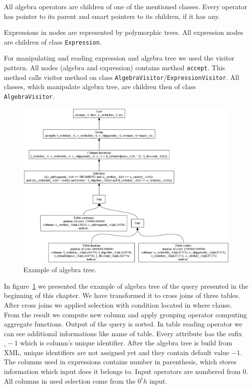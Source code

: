 All algebra operators are children of one of the mentioned classes. Every operator has pointer to its parent and smart pointers to its children, if it has any. 

Expressions in nodes are represented by polymorphic trees. All expression nodes are children of class \texttt{Expression}.

For manipulating and reading expression and algebra tree we used the visitor pattern. All nodes (algebra and expression) contains method \texttt{accept}. This method calls visitor method on class \texttt{AlgebraVisitor}/\texttt{ExpressionVisitor}. All classes, which manipulate algebra tree, are children then of class \texttt{AlgebraVisitor}.


\begin{figure}[h!]
  \centering
    \includegraphics[width=1.0\textwidth]{algebratree1}

      \caption{Example of algebra tree.}
          \label{fig:algebratree1}
\end{figure}

In figure~\ref{fig:algebratree1} we presented the example of algebra tree of the query presented in the beginning of this chapter. We have transformed it to cross joins of three tables. After cross joins we applied selection with condition located in where clause. From the result we compute new column and apply grouping operator computing aggregate functions. Output of the query is sorted. In table reading operator we can see additional informations like name of table. Every attribute has the sufix $\_-1$ which is column's unique identifier. After the algebra tree is build from XML, unique identifiers are not assigned yet and they contain default value $-1$. The columns used in expressions contains number in parenthesis, which stores information which input does it belongs to. Input operators are numbered from $0$. All columns in used selection come from the $0^th$ input.

